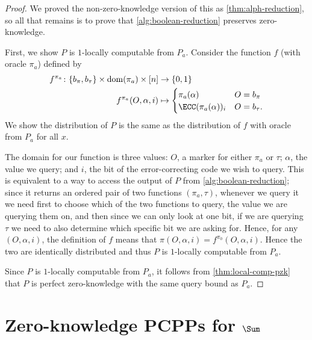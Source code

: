\documentclass[english,12pt]{reedthesis}
\theoremstyle{plain}
\theoremstyle{definition}
\theoremstyle{remark}
\DeclareMathOperator{\dom}{dom}
\begin{document}
\begin{proof}
  We proved the non-zero-knowledge version of this as \cref{thm:alph-reduction},
  so all that remains is to prove that \cref{alg:boolean-reduction} preserves
  zero-knowledge.

  First, we show $P$ is $1$-locally computable from $P_{a}$. Consider the
  function $f$ (with oracle $\pi_{a}$) defined by
  \begin{equation}\label{eqn:local-alph-red}
    \begin{aligned}
      f^{\pi_{a}}\colon \{b_{\pi}, b_{\tau}\} \times \dom(\pi_{a}) \times [n] &\rightarrow \{0, 1\} \\
      f^{\pi_{a}}(O, \alpha, i) &\mapsto \begin{cases}
        \pi_{a}(\alpha) & O = b_{\pi} \\
        \ECC(\pi_{a}(\alpha))_{i} & O = b_{\tau}.
      \end{cases}
    \end{aligned}
  \end{equation}
  We show the distribution of $P$ is the same as the distribution of $f$ with
  oracle from $P_{a}$ for all $x$.

  The domain for our function is three values: $O$, a marker for either $\pi_{a}$
  or $\tau$; $\alpha$, the value we query; and $i$, the bit of the error-correcting code
  we wish to query. This is equivalent to a way to access the output of $P$ from
  \cref{alg:boolean-reduction}; since it returns an ordered pair of two
  functions $(\pi_{a}, \tau)$, whenever we query it we need first to choose which of
  the two functions to query, the value we are querying them on, and then since
  we can only look at one bit, if we are querying $\tau$ we need to also determine
  which specific bit we are asking for. Hence, for any $(O, \alpha, i)$, the
  definition of $f$ means that $\pi(O, \alpha, i) = f^{\pi_{0}}(O, \alpha, i)$. Hence the two
  are identically distributed and thus $P$ is $1$-locally computable from
  $P_{a}$.

  Since $P$ is $1$-locally computable from $P_{a}$, it follows from
  \cref{thm:local-comp-pzk} that $P$ is perfect zero-knowledge with the same
  query bound as $P_{a}$.
\end{proof}

\section{Zero-knowledge PCPPs for $\Sum$}\label{sec:zk-pcpp-sum}
\end{document}
